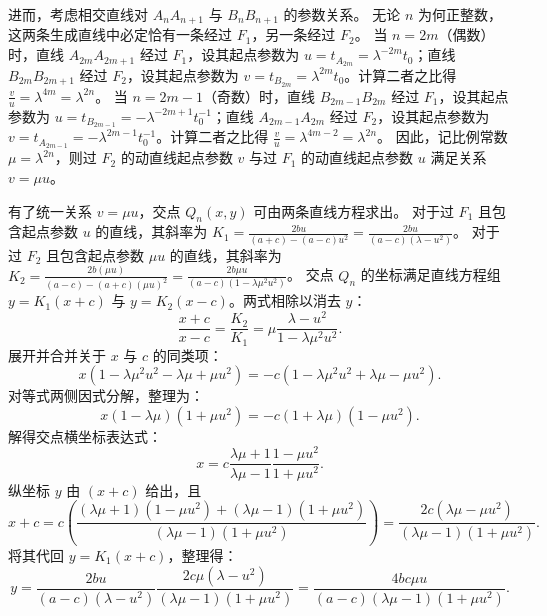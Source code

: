 \begin{solution}
进而，考虑相交直线对 $A_n A_{n+1}$ 与 $B_n B_{n+1}$ 的参数关系。
无论 $n$ 为何正整数，这两条生成直线中必定恰有一条经过 $F_1$，另一条经过 $F_2$。
当 $n=2m$（偶数）时，直线 $A_{2m} A_{2m+1}$ 经过 $F_1$，设其起点参数为 $u = t_{A_{2m}} = \lambda^{-2m} t_0$；直线 $B_{2m} B_{2m+1}$ 经过 $F_2$，设其起点参数为 $v = t_{B_{2m}} = \lambda^{2m} t_0$。计算二者之比得 $\frac{v}{u} = \lambda^{4m} = \lambda^{2n}$。
当 $n=2m-1$（奇数）时，直线 $B_{2m-1} B_{2m}$ 经过 $F_1$，设其起点参数为 $u = t_{B_{2m-1}} = -\lambda^{-2m+1} t_0^{-1}$；直线 $A_{2m-1} A_{2m}$ 经过 $F_2$，设其起点参数为 $v = t_{A_{2m-1}} = -\lambda^{2m-1} t_0^{-1}$。计算二者之比得 $\frac{v}{u} = \lambda^{4m-2} = \lambda^{2n}$。
因此，记比例常数 $\mu = \lambda^{2n}$，则过 $F_2$ 的动直线起点参数 $v$ 与过 $F_1$ 的动直线起点参数 $u$ 满足关系 $v = \mu u$。

有了统一关系 $v=\mu u$，交点 $Q_n(x,y)$ 可由两条直线方程求出。
对于过 $F_1$ 且包含起点参数 $u$ 的直线，其斜率为 $K_1 = \frac{2bu}{(a+c) - (a-c)u^2} = \frac{2bu}{(a-c)(\lambda - u^2)}$。
对于过 $F_2$ 且包含起点参数 $\mu u$ 的直线，其斜率为 $K_2 = \frac{2b(\mu u)}{(a-c) - (a+c)(\mu u)^2} = \frac{2b\mu u}{(a-c)(1 - \lambda \mu^2 u^2)}$。
交点 $Q_n$ 的坐标满足直线方程组 $y = K_1(x+c)$ 与 $y = K_2(x-c)$。两式相除以消去 $y$：
\[ \frac{x+c}{x-c} = \frac{K_2}{K_1} = \mu \frac{\lambda - u^2}{1 - \lambda \mu^2 u^2}. \]
展开并合并关于 $x$ 与 $c$ 的同类项：
\[ x(1 - \lambda \mu^2 u^2 - \lambda \mu + \mu u^2) = -c(1 - \lambda \mu^2 u^2 + \lambda \mu - \mu u^2). \]
对等式两侧因式分解，整理为：
\[ x(1 - \lambda \mu)(1 + \mu u^2) = -c(1 + \lambda \mu)(1 - \mu u^2). \]
解得交点横坐标表达式：
\[ x = c \frac{\lambda \mu + 1}{\lambda \mu - 1} \frac{1 - \mu u^2}{1 + \mu u^2}. \]
纵坐标 $y$ 由 $(x+c)$ 给出，且
\[ x+c = c \left( \frac{(\lambda \mu + 1)(1 - \mu u^2) + (\lambda \mu - 1)(1 + \mu u^2)}{(\lambda \mu - 1)(1 + \mu u^2)} \right) = \frac{2c(\lambda \mu - \mu u^2)}{(\lambda \mu - 1)(1 + \mu u^2)}. \]
将其代回 $y = K_1(x+c)$，整理得：
\[ y = \frac{2bu}{(a-c)(\lambda - u^2)} \frac{2c\mu(\lambda - u^2)}{(\lambda \mu - 1)(1 + \mu u^2)} = \frac{4bc \mu u}{(a-c)(\lambda \mu - 1)(1 + \mu u^2)}. \]


\end{solution}
